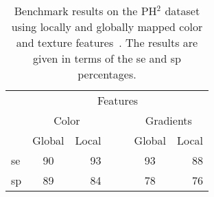 \begin{table}[t]
\caption[The PH$^{2}$ benchmark results]{Benchmark results on the PH$^{2}$ dataset using locally and globally mapped color and texture features~\cite{barata2013two}. The results are given in terms of the \ac{se} and \ac{sp} percentages.}
\label{tab:PH2benchmark}
\medskip
\centering	
\footnotesize{
\begin{tabularx}{0.5\linewidth}{l cr ll cr}
\toprule
 & \multicolumn{6}{c}{Features}\\
 \cmidrule{2-7}
 & \multicolumn{2}{c}{Color} & & & \multicolumn{2}{c}{Gradients} \\
\cmidrule{2-3} \cmidrule{6-7}
 & Global & Local &  &  &  Global & Local \\
\midrule
\ac{se} & 90  &  93   & & &  93  &  88  \\
\ac{sp} & 89  &  84   & & &  78  &  76  \\
 
  \bottomrule
  \end{tabularx}
  }
\end{table}
